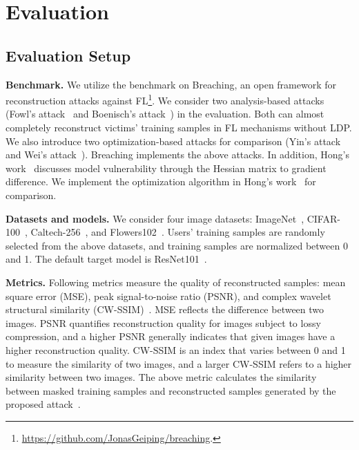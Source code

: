 \documentclass[lettersize,journal]{IEEEtran}
\begin{document}
\section{Evaluation}
\label{section-evaluation}

\subsection{Evaluation Setup}
\label{section-evaluation-setup}

\textbf{Benchmark.}
We utilize the benchmark on Breaching, an open framework for reconstruction attacks against FL\footnote{\url{https://github.com/JonasGeiping/breaching}.}. We consider two analysis-based attacks (Fowl's attack~\cite{fowl2022robbing} and Boenisch's attack~\cite{Boenisch2021When}) in the evaluation. Both can almost completely reconstruct victims' training samples in FL mechanisms without LDP. We also introduce two optimization-based attacks for comparison (Yin's attack~\cite{Yin2021see} and Wei's attack~\cite{Wei2020Framework}). Breaching implements the above attacks. In addition, Hong's work~\cite{hong2024foreseeing} discusses model vulnerability through the Hessian matrix to gradient difference. We implement the optimization algorithm in Hong's work~\cite{hong2024foreseeing} for comparison.

\textbf{Datasets and models.}
We consider four image datasets: ImageNet~\cite{ILSVRC15}, CIFAR-100~\cite{krizhevsky2009learning}, Caltech-256~\cite{griffin2007caltech}, and Flowers102~\cite{nilsback2008automated}. Users' training samples are randomly selected from the above datasets, and training samples are normalized between 0 and 1. The default target model is ResNet101~\cite{he2016deep}.

\textbf{Metrics.}
Following metrics measure the quality of reconstructed samples: mean square error (MSE), peak signal-to-noise ratio (PSNR), and complex wavelet structural similarity (CW-SSIM)~\cite{cw-ssim2009Sampat}. MSE reflects the difference between two images. PSNR quantifies reconstruction quality for images subject to lossy compression, and a higher PSNR generally indicates that given images have a higher reconstruction quality. CW-SSIM is an index that varies between 0 and 1 to measure the similarity of two images, and a larger CW-SSIM refers to a higher similarity between two images. The above metric calculates the similarity between masked training samples and reconstructed samples generated by the proposed attack~\cite{Nguyen2024Preserving,Song2023lsecnet}.
\end{document}
